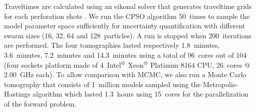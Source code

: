 \begin{table}[!htbp]
	\centering
	\caption{Lower and upper boundaries of each layer parameters. Particles are uniformly initialized in the search space.}
	\label{tab:search_space}
\end{table}

Traveltimes are calculated using an eikonal solver that generates traveltime grids for each perforation shots \citep{Noble2014}. We run the CPSO algorithm 50~times to sample the model parameter space sufficiently for uncertainty quantification with different swarm sizes (16, 32, 64 and 128~particles). A run is stopped when 200~iterations are performed. The four tomographies lasted respectively 1.8~minutes, 3.6~minutes, 7.2~minutes and 14.3~minutes using a total of 96~cores {\color{\revision}out of 104 (four sockets platform made of 4~Intel$^{\mbox{\scriptsize{\textregistered}}}$ Xeon$^{\mbox{\scriptsize{\textregistered}}}$ Platinum 8164 CPU, 26~cores @ 2.00~GHz each)}. To allow comparison with MCMC, we also run a Monte Carlo tomography that consists of 1~million models sampled using the Metropolis-Hastings algorithm which lasted 1.3~hours using 15~cores for the parallelization of the forward problem.


